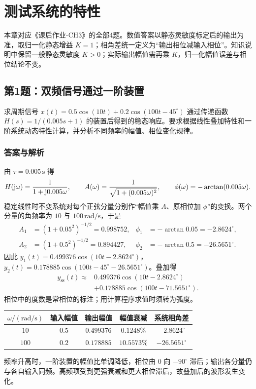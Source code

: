 \chapter{测试系统的特性}
\label{hw:systems}

\noindent 本章对应《课后作业-CH3》的全部4题。数值答案以静态灵敏度标定后的输出为准，取归一化静态增益 $K=1$；相角差统一定义为“输出相位减输入相位”。知识说明中保留一般静态灵敏度 $K>0$；实际输出幅值需再乘 $K$，归一化幅值误差与相位结论不变。

\section{第1题：双频信号通过一阶装置}
\label{hw:3-1}
\begin{hwquestion}
求周期信号 $x(t)=0.5\cos(10t)+0.2\cos(100t-45^\circ)$ 通过传递函数
$H(s)=1/(0.005s+1)$ 的装置后得到的稳态响应。要求根据线性叠加特性和一阶系统动态特性计算，并分析不同频率的幅值、相位变化规律。
\end{hwquestion}

\subsection*{答案与解析}
由 $\tau=0.005\,\mathrm{s}$ 得
\[
H(\mathrm{j}\omega)=\frac{1}{1+\mathrm{j}0.005\omega},\qquad
A(\omega)=\frac{1}{\sqrt{1+(0.005\omega)^2}},\qquad
\phi(\omega)=-\arctan(0.005\omega).
\]
稳定线性时不变系统对每个正弦分量分别作“幅值乘 $A$、原相位加 $\phi$”的变换。两个分量的角频率为 $10$ 与 $100\,\mathrm{rad/s}$，于是
\begin{align*}
A_1&=(1+0.05^2)^{-1/2}=0.998752,
&\phi_1&=-\arctan0.05=-2.8624^\circ,\\
A_2&=(1+0.5^2)^{-1/2}=0.894427,
&\phi_2&=-\arctan0.5=-26.5651^\circ.
\end{align*}
因此 $y_1(t)=0.499376\cos(10t-2.8624^\circ)$，
$y_2(t)=0.178885\cos(100t-45^\circ-26.5651^\circ)$。叠加得
\[
\boxed{\begin{aligned}
y_{\mathrm{ss}}(t)\approx{}&0.499376\cos(10t-2.8624^\circ)\\
&+0.178885\cos(100t-71.5651^\circ).
\end{aligned}}
\]
相位中的度数是常相位的标注；用计算程序求值时须转为弧度。

\begin{center}
\small
\begin{tabular}{@{}ccccc@{}}
\toprule
$\omega/(\mathrm{rad/s})$ & 输入幅值 & 输出幅值 & 幅值衰减 & 系统相角差\\
\midrule
$10$ & $0.5$ & $0.499376$ & $0.1248\%$ & $-2.8624^\circ$\\
$100$ & $0.2$ & $0.178885$ & $10.5573\%$ & $-26.5651^\circ$\\
\bottomrule
\end{tabular}
\end{center}
频率升高时，一阶装置的幅值比单调降低，相位由 $0$ 向 $-90^\circ$ 滞后；输出各分量仍与各自输入同频。高频项受到更强衰减和更大相位滞后，故叠加后的波形发生变化。

